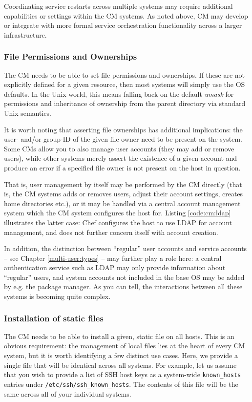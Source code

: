 Coordinating service restarts across multiple systems
may require additional capabilities or settings within
the CM systems.  As noted above, CM may develop or
integrate with more formal service orchestration
functionality across a larger infrastructure.


\subsubsection*{File Permissions and Ownerships} The
CM needs to be able to set file permissions and
ownerships.  If these are not explicitly defined for a
given resource, then most systems will simply use the
OS defaults.  In the Unix world, this means falling
back on the default {\em umask} for
permissions and inheritance of ownership from the
parent directory via standard Unix semantics.

It is worth noting that asserting file ownerships has
additional implications: the user- and/or group-ID of
the given file owner need to be present on the
system.  Some CMs allow you to also manage user
accounts (they may add or remove users), while other
systems merely assert the existence of a given account
and produce an error if a specified file owner is not
present on the host in question.

That is, user management by itself may be performed by
the CM directly (that is, the CM systems adds or
removes users, adjust their account settings, creates
home directories etc.), or it may be handled via a
central account management system which the CM system
configures the host for.  Listing \ref{code:cm:ldap}
illustrates the latter case: Chef configures the host
to use LDAP for account management, and does not
further concern itself with account creation.

In addition, the distinction between ``regular'' user
accounts and service accounts -- see Chapter
\ref{multi-user:types} -- may further play a role
here: a central authentication service such as LDAP
may only provide information about ``regular'' users,
and system accounts not included in the base OS may be
added by e.g. the package manager.  As you can tell,
the interactions between all these systems is becoming
quite complex.

\subsubsection*{Installation of static files}
The CM needs to be able to install a given, static
file on all hosts.  This is an obvious requirement:
the management of local files lies at the heart of
every CM system, but it is worth identifying a few
distinct use cases.  Here, we provide a single file
that will be identical across all systems.  For
example, let us assume that you wish to provide a list
of SSH host keys as a system-wide {\tt known\_hosts}
entries under {\tt /etc/ssh/ssh\_known\_hosts}.  The
contents of this file will be the same across all of
your individual systems.

